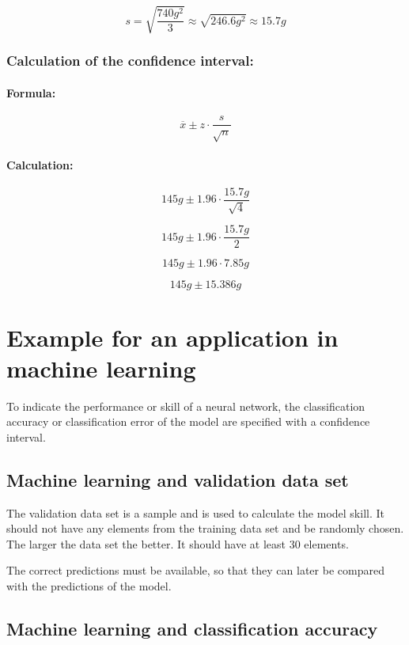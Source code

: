 \documentclass[a4paper,13pt,twoside]{book}
\begin{document}
$$
s =
\sqrt{\frac{740 g^{2}}{3}} \approx
\sqrt{246.6 g^{2}} \approx 15.7 g
$$



\subsubsection{Calculation of the confidence interval:}

\paragraph{Formula:}

$$
\overline{x} \pm 
z \cdot
\frac{s}{\sqrt{n}}
$$

\paragraph{Calculation:}

$$
145 g \pm 
1.96 \cdot
\frac{15.7 g}{\sqrt{4}}
$$

$$
145 g \pm 
1.96 \cdot
\frac{15.7 g}{2}
$$

$$
145 g \pm 
1.96 \cdot
7.85 g
$$

$$
145 g \pm 
15.386 g
$$



\section{Example for an application in machine learning}

To indicate the performance or skill of a neural network, the classification accuracy or classification error of the model are specified with a confidence interval.



\subsection{Machine learning and validation data set}

The validation data set is a sample and is used to calculate the model skill. It should not have any elements from the training data set and be randomly chosen. The larger the data set the better. It should have at least 30 elements.

The correct predictions must be available, so that they can later be compared with the predictions of the model.



\subsection{Machine learning and classification accuracy}
\end{document}
